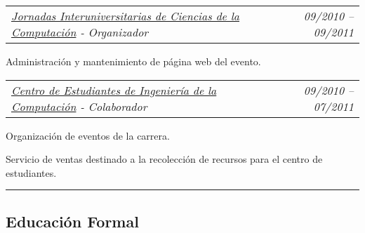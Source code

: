 \documentclass[10pt,letterpaper]{article}
\makeatletter
\newcommand{\headerrow}[2]
{\begin{tabular*}{\linewidth}{l@{\extracolsep{\fill}}r}
	#1 &
	#2 \\
\end{tabular*}}
\makeatother
\begin{document}
\begin{itemize}
  \headerrow
  {\emph{\href{http://joincic.com.ve}{Jornadas Interuniversitarias de Ciencias de la Computación} - Organizador}}
  {\emph{09/2010 -- 09/2011}}
  \begin{itemize*}
  \item Administración y mantenimiento de página web del evento.
  \end{itemize*}
  
  \headerrow
  {\emph{\href{http://usbceic.ldc.usb.ve}{Centro de Estudiantes de Ingeniería de la Computación} - Colaborador}}
  {\emph{09/2010 -- 07/2011}}
  \begin{itemize*}
  \item Organización de eventos de la carrera.
  \item Servicio de ventas destinado a la recolección
    de recursos para el centro de estudiantes.
  \end{itemize*}

\end{itemize}


\hrule

\vspace{-0.4em}
\subsection*{Educación Formal}
\end{document}

